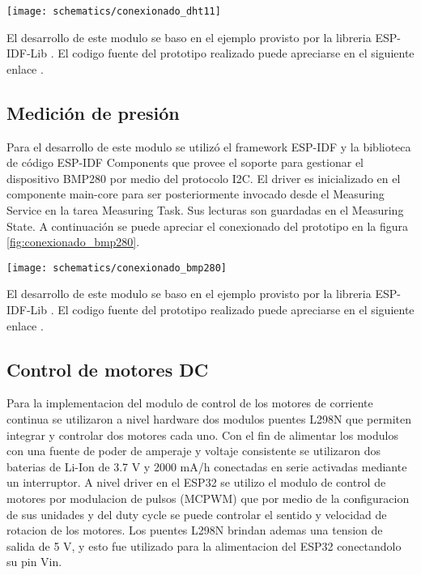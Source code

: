 \begin{center}
  \texttt{[image: schematics/conexionado\_dht11]}
    \label{fig:conexionado_dht11}
\end{center}

El desarrollo de este modulo se baso en el ejemplo provisto por la libreria ESP-IDF-Lib \cite{ESP32_dht11_example}. El codigo fuente del prototipo realizado puede apreciarse en el siguiente enlace \cite{ESP32_POC_dht11}.

\subsection{Medición de presión}
Para el desarrollo de este modulo se utilizó el framework ESP-IDF y la biblioteca de código ESP-IDF Components que provee el soporte para gestionar el dispositivo BMP280 por medio del protocolo I2C. El driver es inicializado en el componente main-core para ser posteriormente invocado desde el Measuring Service en la tarea Measuring Task. Sus lecturas son guardadas en el Measuring State. A continuación se puede apreciar el conexionado del prototipo en la figura \ref{fig:conexionado_bmp280}.
  
  
\begin{center}
  \texttt{[image: schematics/conexionado\_bmp280]}
    \label{fig:conexionado_bmp280}
\end{center}

El desarrollo de este modulo se baso en el ejemplo provisto por la libreria ESP-IDF-Lib \cite{ESP32_bmp280_example}. El codigo fuente del prototipo realizado puede apreciarse en el siguiente enlace \cite{ESP32_POC_bmp280}.


\subsection{Control de motores DC}

Para la implementacion del modulo de control de los motores de corriente continua se utilizaron a nivel hardware dos modulos puentes L298N \cite{L298N} que permiten integrar y controlar dos motores cada uno. Con el fin de alimentar los modulos con una fuente de poder de amperaje y voltaje consistente se utilizaron dos baterias de Li-Ion de 3.7 V y 2000 mA/h conectadas en serie activadas mediante un interruptor.
A nivel driver en el ESP32 se utilizo el modulo de control de motores por modulacion de pulsos (MCPWM) \cite{ESP32_MCPWM} que por medio de la configuracion de sus unidades y del duty cycle \cite{ESP32_MCPWM_2} se puede controlar el sentido y velocidad de rotacion de los motores. 
Los puentes L298N brindan ademas una tension de salida de 5 V, y esto fue utilizado para la alimentacion del ESP32 conectandolo su pin Vin.

